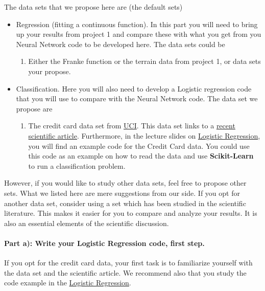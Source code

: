 \documentclass[%
oneside,                 %
final,                   %
10pt]{article}
\begin{document}
The data sets that we propose here are (the default sets)

\begin{itemize}
\item Regression (fitting a continuous function). In this part you will need to bring up your results from project 1 and compare these with what you get from you Neural Network code to be developed here. The data sets could be
\begin{enumerate}

 \item Either the Franke function or the terrain data from project 1, or data sets your propose.

\end{enumerate}

\noindent
\item Classification. Here you will also need to develop a Logistic regression code that you will use to compare with the Neural Network code. The data set we propose are
\begin{enumerate}

 \item The credit card data set from \href{{https://archive.ics.uci.edu/ml/datasets/default+of+credit+card+clients}}{UCI}. This data set links to a \href{{https://bradzzz.gitbooks.io/ga-seattle-dsi/content/dsi/dsi_05_classification_databases/2.1-lesson/assets/datasets/DefaultCreditCardClients_yeh_2009.pdf}}{recent scientific article}.  Furthermore, in the lecture slides on \href{{https://compphysics.github.io/MachineLearning/doc/pub/LogReg/html/LogReg.html}}{Logistic Regression}, you will find an example code for the Credit Card data. You could use this code as an example on how to read the data and use \textbf{Scikit-Learn} to run a classification problem.  
\end{enumerate}

\noindent
\end{itemize}

\noindent
However, if you would like to study other data sets, feel free to
propose other sets. What we listed here are mere suggestions from our
side. If you opt for another data set, consider using a set which
has been studied in the scientific literature. This makes it easier
for you to compare and analyze your results. It is also an essential
elements of the scientific discussion.

\paragraph{Part a): Write your Logistic Regression code, first step.}
If you opt for the credit card data, your first task is to familiarize yourself with the data set and the scientific article. 
We recommend also that you study the code example in the \href{{https://compphysics.github.io/MachineLearning/doc/pub/LogReg/html/LogReg.html}}{Logistic Regression}. 
\end{document}
